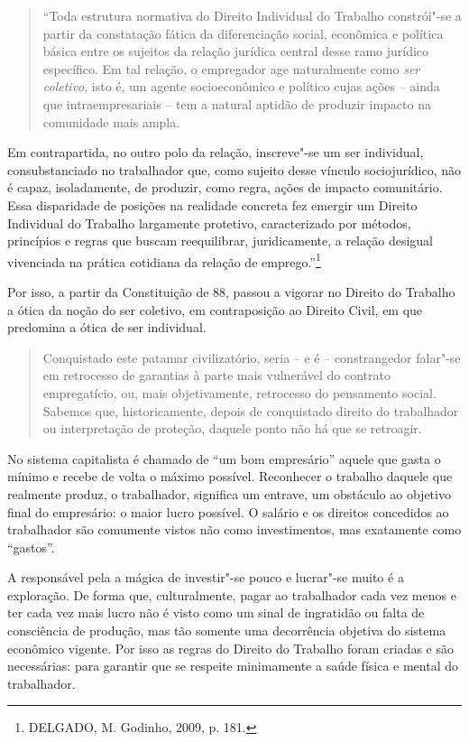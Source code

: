 \begin{quote}
``Toda estrutura normativa do Direito Individual do Trabalho constrói"-se
a partir da constatação fática da diferenciação social, econômica e
política básica entre os sujeitos da relação jurídica central desse ramo
jurídico específico. Em tal relação, o empregador age naturalmente como
\emph{ser coletivo}, isto é, um agente socioeconômico e político cujas
ações -- ainda que intraempresariais -- tem a natural aptidão de
produzir impacto na comunidade mais ampla.
\end{quote}

Em contrapartida, no outro polo da relação, inscreve"-se um ser
individual, consubstanciado no trabalhador que, como sujeito desse
vínculo sociojurídico, não é capaz, isoladamente, de produzir, como
regra, ações de impacto comunitário. Essa disparidade de posições na
realidade concreta fez emergir um Direito Individual do Trabalho
largamente protetivo, caracterizado por métodos, princípios e regras que
buscam reequilibrar, juridicamente, a relação desigual vivenciada na
prática cotidiana da relação de emprego.''\footnote{DELGADO, M. Godinho,
  2009, p. 181.}

Por isso, a partir da Constituição de 88, passou a vigorar no Direito do
Trabalho a ótica da noção do ser coletivo, em contraposição ao Direito
Civil, em que predomina a ótica de ser individual.

\begin{quote}
Conquistado este patamar civilizatório, seria -- e é -- constrangedor
falar"-se em retrocesso de garantias à parte mais vulnerável do contrato
empregatício, ou, mais objetivamente, retrocesso do pensamento social.
Sabemos que, historicamente, depois de conquistado direito do
trabalhador ou interpretação de proteção, daquele ponto não há que se
retroagir.
\end{quote}

No sistema capitalista é chamado de ``um bom empresário'' aquele que
gasta o mínimo e recebe de volta o máximo possível. Reconhecer o
trabalho daquele que realmente produz, o trabalhador, significa um
entrave, um obstáculo ao objetivo final do empresário: o maior lucro
possível. O salário e os direitos concedidos ao trabalhador são
comumente vistos não como investimentos, mas exatamente como ``gastos''.

A responsável pela a mágica de investir"-se pouco e lucrar"-se muito é a
exploração. De forma que, culturalmente, pagar ao trabalhador cada vez
menos e ter cada vez mais lucro não é visto como um sinal de ingratidão
ou falta de consciência de produção, mas tão somente uma decorrência
objetiva do sistema econômico vigente. Por isso as regras do Direito do
Trabalho foram criadas e são necessárias: para garantir que se respeite
minimamente a saúde física e mental do trabalhador.

